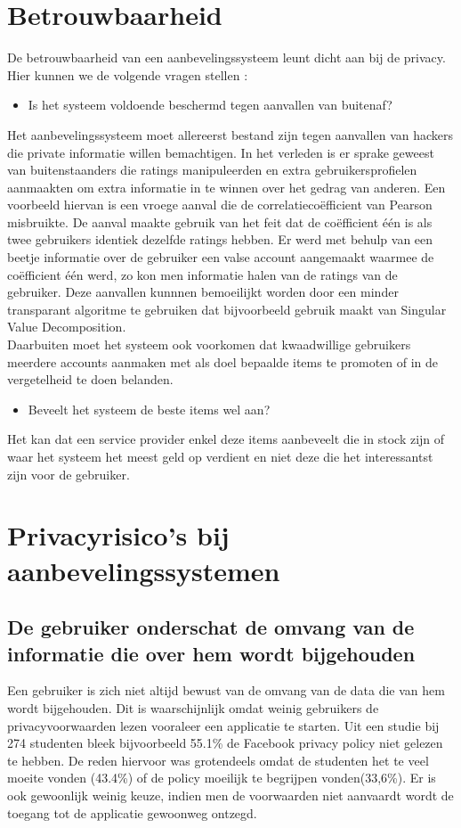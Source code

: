 \section{Betrouwbaarheid}
De betrouwbaarheid van een aanbevelingssysteem leunt dicht aan bij de privacy. Hier kunnen we de volgende vragen stellen : 

\begin{itemize}
 
\item Is het systeem voldoende beschermd tegen aanvallen van buitenaf?
\end{itemize}
 Het aanbevelingssysteem moet allereerst bestand zijn tegen aanvallen van hackers die private informatie willen bemachtigen. In het verleden is er sprake geweest van buitenstaanders die ratings manipuleerden en extra gebruikersprofielen aanmaakten om extra informatie in te winnen over het gedrag van anderen. Een voorbeeld hiervan is een vroege aanval die de correlatieco\"efficient van Pearson misbruikte. De aanval maakte gebruik van het feit dat de co\"efficient \'e\'en is als twee gebruikers identiek dezelfde ratings hebben. Er werd met behulp van een beetje informatie over de gebruiker een valse account aangemaakt waarmee de co\"efficient \'e\'en werd, zo kon men informatie halen van de ratings van de gebruiker.  Deze aanvallen kunnnen bemoeilijkt worden door een minder transparant algoritme te gebruiken dat bijvoorbeeld gebruik maakt van Singular Value Decomposition. \\Daarbuiten moet het systeem ook voorkomen dat kwaadwillige gebruikers meerdere accounts aanmaken met als doel bepaalde items te promoten of in de vergetelheid te doen belanden. 
 
 \begin{itemize}
\item Beveelt het systeem de beste items wel aan?
\end{itemize}
 
  Het kan dat een service provider enkel deze items aanbeveelt die in stock zijn of waar het systeem het meest geld op verdient en niet deze die het interessantst zijn voor de gebruiker. 

\section{Privacyrisico's bij aanbevelingssystemen}
\label{sec:risicos}
\subsection{De gebruiker onderschat de omvang van de informatie die over hem wordt bijgehouden}
Een gebruiker is zich niet altijd bewust van de omvang van de data die van hem wordt bijgehouden\cite{pirs}. Dit is waarschijnlijk omdat weinig gebruikers de privacyvoorwaarden lezen vooraleer een applicatie te starten. Uit een studie \cite{privdisc} bij 274 studenten bleek bijvoorbeeld 55.1\% de Facebook privacy policy niet gelezen te hebben. De reden hiervoor was grotendeels omdat de studenten het te veel moeite vonden (43.4\%) of de policy moeilijk te begrijpen vonden(33,6\%). Er is ook gewoonlijk weinig keuze, indien men de voorwaarden niet aanvaardt wordt de toegang tot de applicatie gewoonweg ontzegd.
